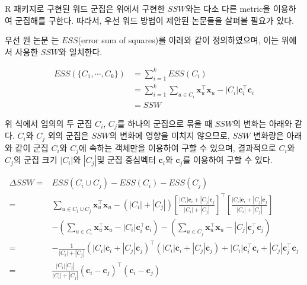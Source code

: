 \documentclass[]{book}
\begin{document}
R 패키지로 구현된 워드 군집은 위에서 구현한 \(SSW\)와는 다소 다른 metric을 이용하여 군집해를 구한다. 따라서, 우선 워드 방법이 제안된 논문들을 살펴볼 필요가 있다.

우선 원 논문 \citet{ward1963hierarchical} 는 \(ESS\)(error sum of squares)를 아래와 같이 정의하였으며, 이는 위에서 사용한 \(SSW\)와 일치한다.

\begin{equation*}
\begin{split}
ESS(\{C_1, \cdots, C_k \}) &= \sum_{i = 1}^{k} ESS(C_i)\\
&= \sum_{i = 1}^{k} \sum_{u \in C_i} \mathbf{x}_u^\top \mathbf{x}_u - |C_i| \mathbf{c}_i^\top \mathbf{c}_i\\
&= SSW
\end{split}
\end{equation*}

위 식에서 임의의 두 군집 \(C_i\), \(C_j\)를 하나의 군집으로 묶을 때 \(SSW\)의 변화는 아래와 같다. \(C_i\)와 \(C_j\) 외의 군집은 \(SSW\)의 변화에 영향을 미치지 않으므로, \(SSW\) 변화량은 아래와 같이 군집 \(C_i\)와 \(C_j\)에 속하는 객체만을 이용하여 구할 수 있으며, 결과적으로 \(C_i\)와 \(C_j\)의 군집 크기 \(|C_i|\)와 \(|C_j|\)및 군집 중심벡터 \(\mathbf{c}_i\)와 \(\mathbf{c}_j\)를 이용하여 구할 수 있다.

\begin{equation}
\begin{split}
\Delta SSW =& ESS(C_i \cup C_j) - ESS(C_i) - ESS(C_j)\\
=& \sum_{u \in C_i \cup C_j} \mathbf{x}_u^\top \mathbf{x}_u - (|C_i| + |C_j|)\left[\frac{|C_i|\mathbf{c}_i + |C_j|\mathbf{c}_j}{|C_i| + |C_j|}\right]^\top \left[\frac{|C_i|\mathbf{c}_i + |C_j|\mathbf{c}_j}{|C_i| + |C_j|}\right]\\
& - \left( \sum_{u \in C_i} \mathbf{x}_u^\top \mathbf{x}_u - |C_i| \mathbf{c}_i^\top \mathbf{c}_i \right) - \left( \sum_{u \in C_j} \mathbf{x}_u^\top \mathbf{x}_u - |C_j| \mathbf{c}_j^\top \mathbf{c}_j \right)\\
=& -\frac{1}{|C_i| + |C_j|} \left( |C_i|\mathbf{c}_i + |C_j|\mathbf{c}_j \right)^\top \left( |C_i|\mathbf{c}_i + |C_j|\mathbf{c}_j \right) + |C_i| \mathbf{c}_i^\top \mathbf{c}_i + |C_j| \mathbf{c}_j^\top \mathbf{c}_j\\
=& \frac{|C_i||C_j|}{|C_i| + |C_j|} \left(\mathbf{c}_i - \mathbf{c}_j\right)^\top \left(\mathbf{c}_i - \mathbf{c}_j\right)
\end{split}
\label{eq:ward-minimand}
\end{equation}
\end{document}
